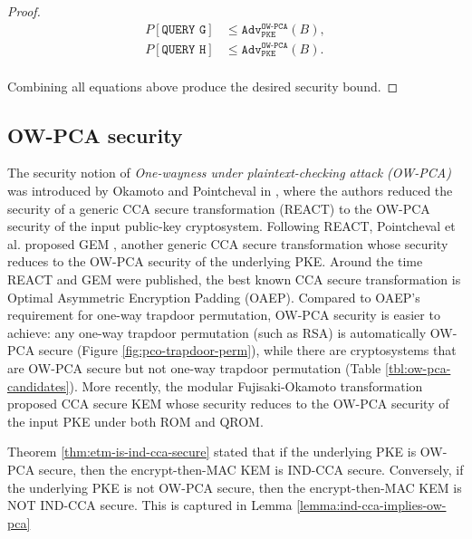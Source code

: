 \documentclass[runningheads]{llncs}
\newcommand{\pke}{\texttt{PKE}}
\newcommand{\adv}{\texttt{Adv}}
\begin{document}
\begin{proof}
    \begin{equation*}
        \begin{aligned}
            P\left[\texttt{QUERY G}\right] &\leq \adv^\texttt{OW-PCA}_\pke(B), \\
            P\left[\texttt{QUERY H}\right] &\leq \adv^\texttt{OW-PCA}_\pke(B). \\
        \end{aligned}
    \end{equation*}

    Combining all equations above produce the desired security bound.
\end{proof}

\subsection{OW-PCA security}\label{sec:ow-pca-security}
The security notion of \textit{One-wayness under plaintext-checking attack (OW-PCA)} was introduced by Okamoto and Pointcheval in \cite{DBLP:conf/ctrsa/OkamotoP01}, where the authors reduced the security of a generic CCA secure transformation (REACT) to the OW-PCA security of the input public-key cryptosystem. Following REACT, Pointcheval et al. proposed GEM \cite{DBLP:conf/ctrsa/CoronHJPPT02}, another generic CCA secure transformation whose security reduces to the OW-PCA security of the underlying PKE. Around the time REACT and GEM were published, the best known CCA secure transformation is Optimal Asymmetric Encryption Padding (OAEP)\cite{DBLP:conf/eurocrypt/BellareR94}. Compared to OAEP's requirement for one-way trapdoor permutation, OW-PCA security is easier to achieve: any one-way trapdoor permutation (such as RSA) is automatically OW-PCA secure (Figure \ref{fig:pco-trapdoor-perm}), while there are cryptosystems that are OW-PCA secure but not one-way trapdoor permutation (Table \ref{tbl:ow-pca-candidates}). More recently, the modular Fujisaki-Okamoto transformation \cite{DBLP:conf/tcc/HofheinzHK17} proposed CCA secure KEM whose security reduces to the OW-PCA security of the input PKE under both ROM and QROM.

Theorem \ref{thm:etm-is-ind-cca-secure} stated that if the underlying PKE is OW-PCA secure, then the encrypt-then-MAC KEM is IND-CCA secure. Conversely, if the underlying PKE is not OW-PCA secure, then the encrypt-then-MAC KEM is NOT IND-CCA secure. This is captured in Lemma \ref{lemma:ind-cca-implies-ow-pca}
\end{document}
